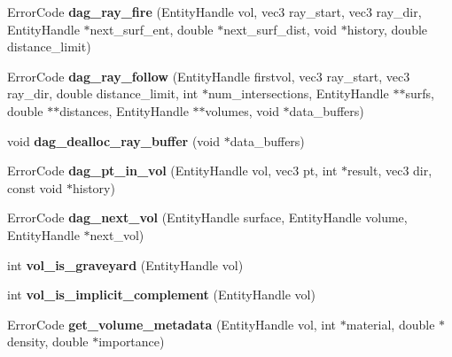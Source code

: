\begin{DoxyCompactItemize}
\item 
\hypertarget{namespacepyne_a64c30defae1f7780ea4a3e1cb16a7a79}{Error\+Code {\bfseries dag\+\_\+ray\+\_\+fire} (Entity\+Handle vol, vec3 ray\+\_\+start, vec3 ray\+\_\+dir, Entity\+Handle $\ast$next\+\_\+surf\+\_\+ent, double $\ast$next\+\_\+surf\+\_\+dist, void $\ast$history, double distance\+\_\+limit)}\label{namespacepyne_a64c30defae1f7780ea4a3e1cb16a7a79}

\item 
\hypertarget{namespacepyne_afc692d9c804c22e7e6b3a30d2d852296}{Error\+Code {\bfseries dag\+\_\+ray\+\_\+follow} (Entity\+Handle firstvol, vec3 ray\+\_\+start, vec3 ray\+\_\+dir, double distance\+\_\+limit, int $\ast$num\+\_\+intersections, Entity\+Handle $\ast$$\ast$surfs, double $\ast$$\ast$distances, Entity\+Handle $\ast$$\ast$volumes, void $\ast$data\+\_\+buffers)}\label{namespacepyne_afc692d9c804c22e7e6b3a30d2d852296}

\item 
\hypertarget{namespacepyne_a9451bba0ed3cd9857c7452cec04ab031}{void {\bfseries dag\+\_\+dealloc\+\_\+ray\+\_\+buffer} (void $\ast$data\+\_\+buffers)}\label{namespacepyne_a9451bba0ed3cd9857c7452cec04ab031}

\item 
\hypertarget{namespacepyne_ae69cdb5021f7dd38def0bbebaa3a99b3}{Error\+Code {\bfseries dag\+\_\+pt\+\_\+in\+\_\+vol} (Entity\+Handle vol, vec3 pt, int $\ast$result, vec3 dir, const void $\ast$history)}\label{namespacepyne_ae69cdb5021f7dd38def0bbebaa3a99b3}

\item 
\hypertarget{namespacepyne_a83bf77ef33027053fa8ddec223554641}{Error\+Code {\bfseries dag\+\_\+next\+\_\+vol} (Entity\+Handle surface, Entity\+Handle volume, Entity\+Handle $\ast$next\+\_\+vol)}\label{namespacepyne_a83bf77ef33027053fa8ddec223554641}

\item 
\hypertarget{namespacepyne_a7844def8817d3880424ed61a474ec8ab}{int {\bfseries vol\+\_\+is\+\_\+graveyard} (Entity\+Handle vol)}\label{namespacepyne_a7844def8817d3880424ed61a474ec8ab}

\item 
\hypertarget{namespacepyne_ab3a6e65aa714fb05584dcbe5fb4e67c3}{int {\bfseries vol\+\_\+is\+\_\+implicit\+\_\+complement} (Entity\+Handle vol)}\label{namespacepyne_ab3a6e65aa714fb05584dcbe5fb4e67c3}

\item 
\hypertarget{namespacepyne_a0068d2c04f0b12f020479176ded0ca99}{Error\+Code {\bfseries get\+\_\+volume\+\_\+metadata} (Entity\+Handle vol, int $\ast$material, double $\ast$density, double $\ast$importance)}\label{namespacepyne_a0068d2c04f0b12f020479176ded0ca99}


\end{DoxyCompactItemize}
